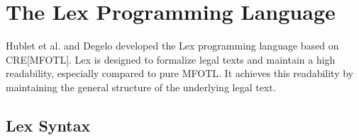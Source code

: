\section{The Lex Programming Language}
\label{section:lex}
Hublet et al. \cite{lex} and Degelo \cite{semesterproject}
developed the Lex programming language based on CRE[MFOTL].
Lex is designed to formalize legal texts and maintain a high
readability, especially compared to pure MFOTL.
It achieves this readability by maintaining the general
structure of the underlying legal text.

\subsection{Lex Syntax}
\label{subsection:lex-syntax}

